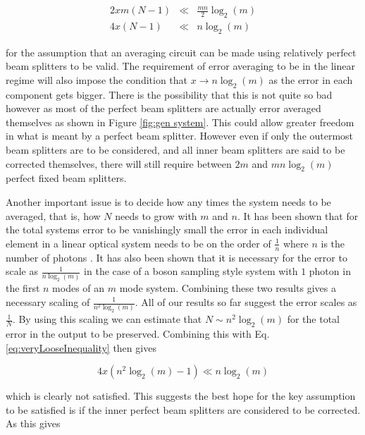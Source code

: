 \documentclass[aps,pra,twocolumn,superscriptaddress,numerical]{revtex4-1}
\begin{document}
		\begin{eqnarray}
			2xm\left(N-1\right) & \ll & \frac{mn}{2}\log_{2}\left(m\right)\nonumber \\
			4x\left(N-1\right) & \ll & n\log_{2}\left(m\right)\label{eq:veryLooseInequality}
		\end{eqnarray}
		
		
		for the assumption that an averaging circuit can be made using relatively perfect beam splitters to be valid. The requirement of error averaging to be in the linear regime will also impose the condition that $x\rightarrow n\log_{2}\left(m\right)$ as the error in each component gets bigger. There is the possibility that this is not quite so bad however as most of the perfect beam splitters are actually error averaged themselves as shown in Figure \ref{fig:gen system}. This could allow greater freedom in what is meant by a perfect beam splitter. However even if only	the outermost beam splitters are to be considered, and all inner beam splitters are said to be corrected themselves, there will still require between $2m$ and $mn\log_{2}\left(m\right)$ perfect fixed beam splitters.
		
		Another important issue is to decide how any times the system needs	to be averaged, that is, how $N$ needs to grow with $m$ and $n$. It has been shown that for the total systems error to be vanishingly small the error in each individual element in a linear optical system	needs to be on the order of $\frac{1}{n}$ where $n$ is the number of photons \cite{arkhipov2014}. It has also been shown that it is	necessary for the error to scale as $\frac{1}{n\log_{2}\left(m\right)}$	\cite{Boson} in the case of a boson sampling style system with $1$ photon in the first $n$ modes of an $m$ mode system. Combining these	two results gives a necessary scaling of $\frac{1}{n^{2}\log_{2}\left(m\right)}$. All of our results so far suggest the error scales as $\frac{1}{N}$. By using this scaling we can estimate that $N\sim n^{2}\log_{2}\left(m\right)$ for the total error in the output to be preserved. Combining this with Eq. \ref{eq:veryLooseInequality} then gives 
		
		\begin{equation}
			4x\left(n^{2}\log_{2}\left(m\right)-1\right)\ll n\log_{2}\left(m\right)\label{eq:LooseInequality}
		\end{equation}
		
		
		which is clearly not satisfied. This suggests the best hope for the key assumption to be satisfied is if the inner perfect beam splitters are considered to be corrected. As this gives
			
\end{document}
